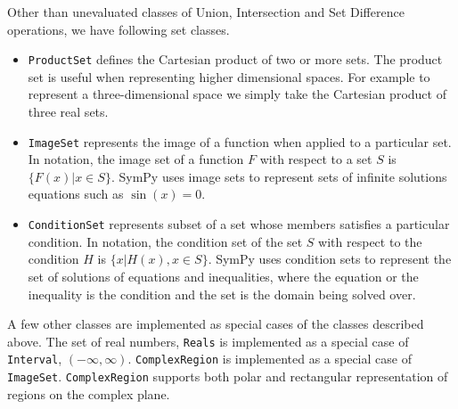 
Other than unevaluated classes of Union, Intersection and Set Difference
operations, we have following set classes.

\begin{itemize}

    \item \verb|ProductSet| defines the Cartesian product of two
        or more sets. The product set is useful when representing higher
        dimensional spaces. For example to represent a three-dimensional space
        we simply take the Cartesian product of three real sets.

      \item \verb|ImageSet| represents the image of a function when applied to
        a particular set. In notation, the image set of a function $F$ with
        respect to a set $S$ is $\{ F(x) | x \in S \}$. SymPy uses image sets
        to represent sets of infinite solutions equations such as $\sin(x)=0$.

      \item \verb|ConditionSet| represents subset of a set whose members
        satisfies a particular condition. In notation, the condition set of
        the set $S$ with respect to the condition $H$ is
        $\{x | H(x), x \in S \}$. SymPy uses condition sets to represent the
        set of solutions of equations and inequalities, where the equation or
        the inequality is the condition and the set is the domain being solved
        over.

\end{itemize}

A few other classes are implemented as special cases of the classes described
above. The set of real numbers, \verb|Reals| is implemented as a special case
of \verb|Interval|, $(-\infty, \infty)$. \verb|ComplexRegion| is implemented
as a special case of \verb|ImageSet|. \verb|ComplexRegion| supports both polar
and rectangular representation of regions on the complex plane.
